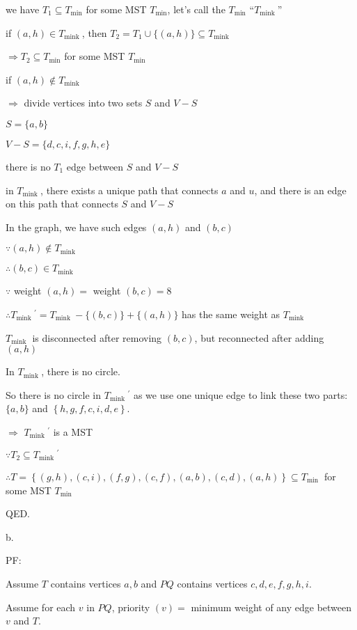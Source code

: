 \documentclass[12pt]{article}
\begin{document}
we have $T_1 \subseteq T_{\min }$ for some MST $T_{\min }$, let's call the $T_{\min }$ ``$T_{\text {mink }}$''

if $(a, h) \in T_{\text {mink }}$, then $T_2=T_1 \cup\{(a , h)\} \subseteq T_{\text {mink }}$

$\Rightarrow T_2 \subseteq T_{\min }$ for some MST $T_{\text {min }}$

if $(a, h) \not\in T_{\text {mink }}$

$\Rightarrow$ divide vertices into two sets $S$ and $V-S$

$S=\{a, b\}$

$V-S=\{d, c , i, f, g, h, e\}$

there is no $T_1$ edge between $S$ and $V-S$

in $T_{\text {mink }}$, there exists a unique path that connects $a$ and $u$, and there is an edge on this path that connects $S$ and $V-S$ 

In the graph, we have such edges $(a,h)$ and $(b,c)$

$\because(a, h) \not\in T_{\text {mink }}$ 

$\therefore(b,c) \in T_{\text {mink }}$

$\because$ weight $(a , h)=$ weight $( b, c)=8$

$\therefore T_{\text {mink }}{ }^{\prime}=T_{\text {mink }}-\{(b ,c)\}+\{(a,h)\}$ has the same weight as $T_{\text {mink }}$

$T_{\text {mink }}$ is disconnected after removing $(b, c)$, but reconnected after adding $(a,h)$

In $T_{\text {mink }}$, there is no circle.

So there is no circle in $T_{\text {mink }}{ }^{\prime}$ as we use one unique edge to link these two parts: $\{a ,b\}$ and $\left\{h, g, f, c, i, d, e\right\}$.

$\Rightarrow$ $T_{\text {mink }}{ }^{\prime}$ is a MST

$\because T_2 \subseteq T_{\text {mink }}{ }^{\prime}$

$\therefore T=\left\{(g, h),(c, i),(f,g),(c,f),(a,b),(c, d),(a,h)\right\} \subseteq T_{\text {min }}$ for some MST $T_{\text {min }}$

QED.

b.

PF:

Assume $T$ contains vertices $a, b$ and $P Q$ contains vertices $c, d, e ,f, g, h, i$.

Assume for each $v$ in $P Q$, priority $(v)=$ minimum weight of any edge between $v$ and $T$.
\end{document}
